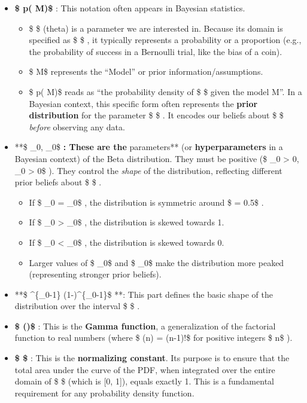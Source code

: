\documentclass[11pt]{article}
\providecommand{\tightlist}{%
      \setlength{\itemsep}{0pt}\setlength{\parskip}{0pt}}
\begin{document}
\begin{itemize}
\tightlist
\item
  \textbf{\$ p(\theta \textbar{} M)\$ }: This notation often appears in
  Bayesian statistics.

  \begin{itemize}
  \tightlist
  \item
    \$ \theta\$ (theta) is a parameter we are interested in. Because its
    domain is specified as \$ \theta \in [0, 1]\$ , it typically
    represents a probability or a proportion (e.g., the probability of
    success in a Bernoulli trial, like the bias of a coin).
  \item
    \$ M\$ represents the ``Model'' or prior information/assumptions.
  \item
    \$ p(\theta \textbar{} M)\$ reads as ``the probability density of \$
    \theta\$ given the model M''. In a Bayesian context, this specific
    form often represents the \textbf{prior distribution} for the
    parameter \$ \theta\$ . It encodes our beliefs about \$ \theta\$
    \emph{before} observing any data.
  \end{itemize}
\item
  **\$ \alpha\_0, \beta\_0\$ \textbf{: These are the }parameters** (or
  \textbf{hyperparameters} in a Bayesian context) of the Beta
  distribution. They must be positive (\$ \alpha\_0 \textgreater{} 0,
  \beta\_0 \textgreater{} 0\$ ). They control the \emph{shape} of the
  distribution, reflecting different prior beliefs about \$ \theta\$ .

  \begin{itemize}
  \tightlist
  \item
    If \$ \alpha\_0 = \beta\_0\$ , the distribution is symmetric around
    \$ \theta = 0.5\$ .
  \item
    If \$ \alpha\_0 \textgreater{} \beta\_0\$ , the distribution is
    skewed towards 1.
  \item
    If \$ \alpha\_0 \textless{} \beta\_0\$ , the distribution is skewed
    towards 0.
  \item
    Larger values of \$ \alpha\_0\$ and \$ \beta\_0\$ make the
    distribution more peaked (representing stronger prior beliefs).
  \end{itemize}
\item
  **\$ \theta\^{}\{\alpha\_0-1\} (1-\theta)\^{}\{\beta\_0-1\}\$ **: This
  part defines the basic shape of the distribution over the interval \$
  \theta \in [0, 1]\$ .
\item
  \textbf{\$ \Gamma(\cdot)\$ }: This is the \textbf{Gamma function}, a
  generalization of the factorial function to real numbers (where \$
  \Gamma(n) = (n-1)!\$ for positive integers \$ n\$ ).
\item
  \textbf{\$
  \$
  }: This is the \textbf{normalizing constant}. Its purpose is to ensure
  that the total area under the curve of the PDF, when integrated over
  the entire domain of \$ \theta\$ (which is {[}0, 1{]}), equals exactly
  1. This is a fundamental requirement for any probability density
  function.
\end{itemize}
\end{document}
